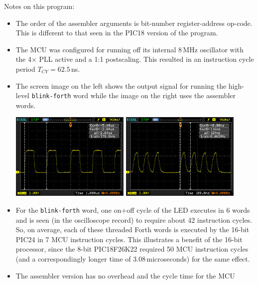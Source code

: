 \documentclass[12pt,a4paper]{article}
\newcommand{\code}[2]{
 \hrulefill
 \scriptsize
 
 \hrulefill
 \vspace{2em}
 \normalsize
}
\begin{document}
\bigskip\noindent
\code{}{../pic24/speed-test-pic24fv32ka302.txt}

\noindent
Notes on this program:
\begin{itemize}
 \item The order of the assembler arguments is bit-number register-address op-code.
  This is different to that seen in the PIC18 version of the program.
 \item The MCU was configured for running off its internal 8\,MHz oscillator with
  the 4$\times$ PLL active and a 1:1 postscaling.  
  This resulted in an instruction cycle period $T_{CY} = 62.5$\,ns.
 \item The screen image on the left shows the output signal for running the high-level
  \verb!blink-forth! word while the image on the right uses the assembler words.
  \begin{center}
  \includegraphics[width=0.45\textwidth]{../figs/speed-test-forth-pic24fv32ka302.jpeg}
  \includegraphics[width=0.45\textwidth]{../figs/speed-test-asm-pic24fv32ka302.jpeg}
  \end{center}
 \item For the \verb!blink-forth! word, one on+off cycle of the LED executes in 6 words
  and is seen (in the oscilloscope record) to require about 42 instruction cycles.
  So, on average, each of these threaded Forth words is executed by the 16-bit PIC24 in 7 MCU instruction cycles.
  This illustrates a benefit of the 16-bit processor, 
  since the 8-bit PIC18F26K22 required 50 MCU instruction cycles 
  (and a correspondingly longer time of 3.08\,microseconds) for the same effect.
 \item The assembler version has no overhead and the cycle time for the MCU

\end{itemize}
\end{document}
